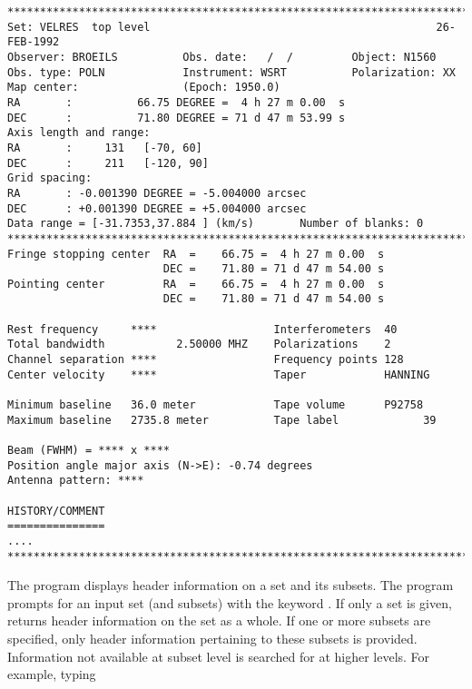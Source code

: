 \begin{table}[p]
\begin{center}
\begin{verbatim}
*****************************************************************************
Set: VELRES  top level                                            26-FEB-1992
Observer: BROEILS          Obs. date:   /  /         Object: N1560
Obs. type: POLN            Instrument: WSRT          Polarization: XX
Map center:                (Epoch: 1950.0)
RA       :          66.75 DEGREE =  4 h 27 m 0.00  s
DEC      :          71.80 DEGREE = 71 d 47 m 53.99 s
Axis length and range:
RA       :     131   [-70, 60]
DEC      :     211   [-120, 90]
Grid spacing:
RA       : -0.001390 DEGREE = -5.004000 arcsec
DEC      : +0.001390 DEGREE = +5.004000 arcsec
Data range = [-31.7353,37.884 ] (km/s)       Number of blanks: 0
*****************************************************************************
Fringe stopping center  RA  =    66.75 =  4 h 27 m 0.00  s
                        DEC =    71.80 = 71 d 47 m 54.00 s
Pointing center         RA  =    66.75 =  4 h 27 m 0.00  s
                        DEC =    71.80 = 71 d 47 m 54.00 s
 
Rest frequency     ****                  Interferometers  40
Total bandwidth           2.50000 MHZ    Polarizations    2
Channel separation ****                  Frequency points 128
Center velocity    ****                  Taper            HANNING
 
Minimum baseline   36.0 meter            Tape volume      P92758
Maximum baseline   2735.8 meter          Tape label             39
 
Beam (FWHM) = **** x ****
Position angle major axis (N->E): -0.74 degrees
Antenna pattern: ****
 
HISTORY/COMMENT
===============
....
*****************************************************************************

\end{verbatim}
\caption{ output}
\label{tab:header1}
\end{center}
\end{table}

The program  displays header information on a set and
its subsets.  The program prompts for an input set (and subsets) with
the keyword .  If only a set is given, 
returns header information on the set as a whole.  If one or more
subsets are specified, only header information pertaining to these
subsets is provided.  Information not available at subset level is
searched for at higher levels.  For example, typing

